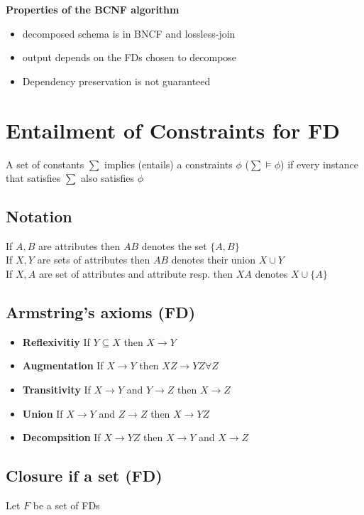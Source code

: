 \documentclass{article}
\begin{document}
\textbf{Properties of the BCNF algorithm} \begin{itemize}
  \item decomposed schema is in BNCF and lossless-join
  \item output depends on the FDs chosen to decompose
  \item Dependency preservation is not guaranteed
\end{itemize}


\section{Entailment of Constraints for FD}
A set of constants $\sum$ implies (entails) a constraints $\phi$ ($\sum \models \phi$) if every instance that satisfies $\sum$ also satisfies $\phi$

\subsection{Notation}
If $A,B$ are attributes then $AB$ denotes the set $\{A,B\}$\\

If $X,Y$ are sets of attributes then $AB$ denotes their union $X\cup Y$\\

If $X,A$ are set of attributes and attribute resp. then $XA$ denotes $X\cup\{A\}$

\subsection{Armstring's axioms (FD)}
\begin{itemize}
  \item \textbf{Reflexivitiy} If $Y \subseteq X$ then $X \rightarrow Y$
  \item \textbf{Augmentation} If $X \rightarrow Y$ then $XZ \rightarrow YZ \forall Z$
  \item \textbf{Transitivity} If $X \rightarrow Y$ and $Y \rightarrow Z$ then $X \rightarrow Z$
  \item \textbf{Union}        If $X \rightarrow Y$ and $Z \rightarrow Z$ then $X \rightarrow YZ$
  \item \textbf{Decompsition} If $X \rightarrow YZ$ then $X \rightarrow Y$ and $X \rightarrow Z$
\end{itemize}

\subsection{Closure if a set (FD)}
Let $F$ be a set of FDs
\end{document}
